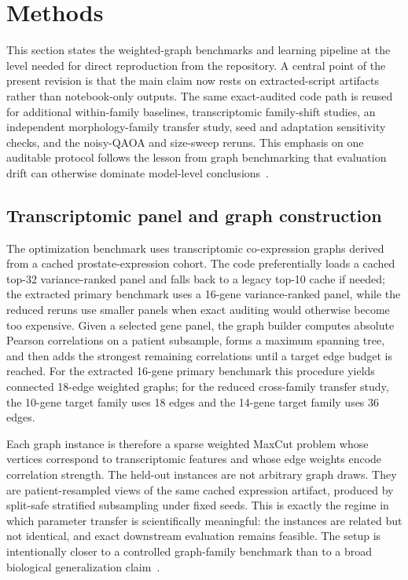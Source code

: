 \documentclass[
  reprint,
  twocolumn,
  aps,
  superscriptaddress,
  longbibliography,
  floatfix
]{revtex4-2}
\begin{document}
\section{Methods}
This section states the weighted-graph benchmarks and learning pipeline at the level needed for direct reproduction from the repository. A central point of the present revision is that the main claim now rests on extracted-script artifacts rather than notebook-only outputs. The same exact-audited code path is reused for additional within-family baselines, transcriptomic family-shift studies, an independent morphology-family transfer study, seed and adaptation sensitivity checks, and the noisy-QAOA and size-sweep reruns. This emphasis on one auditable protocol follows the lesson from graph benchmarking that evaluation drift can otherwise dominate model-level conclusions~\cite{hu2020ogb,dwivedi2020}.

\subsection{Transcriptomic panel and graph construction}
The optimization benchmark uses transcriptomic co-expression graphs derived from a cached prostate-expression cohort. The code preferentially loads a cached top-32 variance-ranked panel and falls back to a legacy top-10 cache if needed; the extracted primary benchmark uses a 16-gene variance-ranked panel, while the reduced reruns use smaller panels when exact auditing would otherwise become too expensive. Given a selected gene panel, the graph builder computes absolute Pearson correlations on a patient subsample, forms a maximum spanning tree, and then adds the strongest remaining correlations until a target edge budget is reached. For the extracted 16-gene primary benchmark this procedure yields connected 18-edge weighted graphs; for the reduced cross-family transfer study, the 10-gene target family uses 18 edges and the 14-gene target family uses 36 edges.

Each graph instance is therefore a sparse weighted MaxCut problem whose vertices correspond to transcriptomic features and whose edge weights encode correlation strength. The held-out instances are not arbitrary graph draws. They are patient-resampled views of the same cached expression artifact, produced by split-safe stratified subsampling under fixed seeds. This is exactly the regime in which parameter transfer is scientifically meaningful: the instances are related but not identical, and exact downstream evaluation remains feasible. The setup is intentionally closer to a controlled graph-family benchmark than to a broad biological generalization claim~\cite{hu2020ogb,you2020design}.
\end{document}
